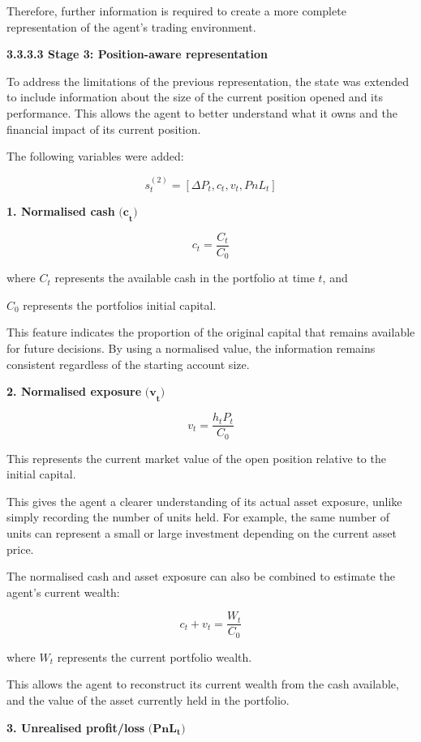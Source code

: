 Therefore, further information is required to create a more complete
representation of the agent's trading environment.

\textbf{3.3.3.3 Stage 3: Position-aware representation}

To address the limitations of the previous representation, the state was
extended to include information about the size of the current position
opened and its performance. This allows the agent to better understand
what it owns and the financial impact of its current position.

The following variables were added:

\[s_{t}^{(2)} = \left\lbrack \Delta P_{t},c_{t},v_{t},PnL_{t} \right\rbrack\]

\textbf{1. Normalised cash} \(\mathbf{(c}_{\mathbf{t}}\mathbf{)}\)

\[c_{t} = \frac{C_{t}}{C_{0}}\]

where \(C_{t}\) represents the available cash in the portfolio at time
\(t\), and

\(C_{0}\) represents the portfolio\textquotesingle s initial capital.

This feature indicates the proportion of the original capital that
remains available for future decisions. By using a normalised value, the
information remains consistent regardless of the starting account size.

\textbf{2. Normalised exposure} \(\mathbf{(v}_{\mathbf{t}}\mathbf{)}\)

\[v_{t} = \frac{h_{t}P_{t}}{C_{0}}\]

This represents the current market value of the open position relative
to the initial capital.

This gives the agent a clearer understanding of its actual asset
exposure, unlike simply recording the number of units held. For example,
the same number of units can represent a small or large investment
depending on the current asset price.

The normalised cash and asset exposure can also be combined to estimate
the agent's current wealth:

\[c_{t} + v_{t} = \frac{W_{t}}{C_{0}}\]

where \(W_{t}\) represents the current portfolio wealth.

This allows the agent to reconstruct its current wealth from the cash
available, and the value of the asset currently held in the portfolio.

\textbf{3. Unrealised profit/loss}
\(\mathbf{(Pn}\mathbf{L}_{\mathbf{t}}\mathbf{)}\)

